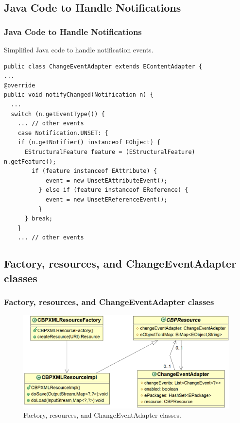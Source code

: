 \documentclass{beamer}
\begin{document}
\begin{frame}[fragile]
\section{Java Code to Handle Notifications}
\frametitle{Java Code to Handle Notifications}
Simplified Java code to handle notification events.
\begin{lstlisting}[style=java,label=lst:javacode]
public class ChangeEventAdapter extends EContentAdapter {
...
@override
public void notifyChanged(Notification n) {
  ...
  switch (n.getEventType()) {
    ... // other events
    case Notification.UNSET: {
    if (n.getNotifier() instanceof EObject) {
      EStructuralFeature feature = (EStructuralFeature) n.getFeature();
        if (feature instanceof EAttribute) {
            event = new UnsetEAttributeEvent();
          } else if (feature instanceof EReference) {
            event = new UnsetEReferenceEvent();
          }
      } break;
    } 
    ... // other events
\end{lstlisting}

\end{frame}

\begin{frame}
\section{Factory, resources, and ChangeEventAdapter classes}
\frametitle{Factory, resources, and ChangeEventAdapter classes}
\begin{figure}[th]
\includegraphics[scale=0.4]{resources}
\caption{Factory, resources, and ChangeEventAdapter classes.}
\end{figure}
\end{frame}
\end{document}

